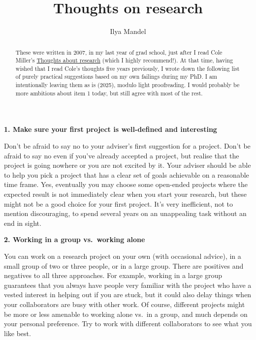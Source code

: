 \documentclass[onecolumn]{aastex7}
\newcommand{\Header}[1]{{\large{\bf{#1}}}}
\begin{document}
\title{Thoughts on research}
\author[0000-0002-6134-8946]{Ilya Mandel}


\begin{abstract}
These were written in 2007, in my last year of grad school, just after I read Cole Miller's \href{https://pages.astro.umd.edu/~mcmiller/teaching/research.pdf}{Thoughts about research} (which I highly recommend!).  At that time, having wished that I read Cole's thoughts five years previously, I wrote down the following list of purely practical suggestions based on my own failings during my PhD.  I am intentionally leaving them as is (2025), modulo light proofreading.  I would probably be more ambitious about item 1 today, but still agree with most of the rest. 
\end{abstract}

\maketitle

\vspace{0.1in}

\Header{1. Make sure your first project is well-defined and interesting}

Don't be afraid to say no to your adviser's first suggestion for a project.  Don't be afraid to say no even if you've already accepted a project, but realise that the project is going nowhere or you are not excited by it.  Your adviser should be able to help you pick a project that has a clear set of goals achievable on a reasonable time frame.  Yes, eventually you may choose some open-ended projects where the expected result is not immediately clear when you start your research, but these might not be a good choice for your first project.  It's very inefficient, not to mention discouraging, to spend several years on an unappealing task without an end in sight.

\Header{2. Working in a group vs.~working alone}

You can work on a research project on your own (with occasional advice), in a small group of two or three people, or in a large group. There are positives and negatives to all three approaches.  For example, working in a large group guarantees that you always have people very familiar with the project who have a vested interest in helping out if you are stuck, but it could also delay things when your collaborators are busy with other work.  Of course, different projects might be more or less amenable to working alone vs.~in a group, and much depends on your personal preference.  Try to work with different collaborators to see what you like best.
\end{document}
